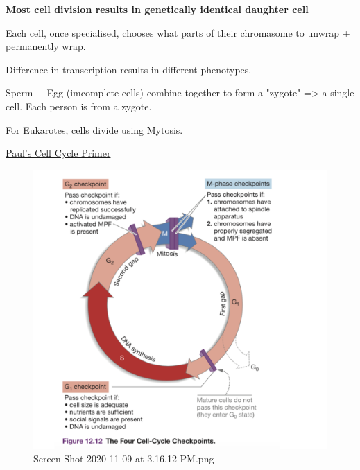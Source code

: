 \documentclass[letterpaper]{article}
\begin{document}
\textbf{Most cell division results in genetically identical daughter cell}

Each cell, once specialised, chooses what parts of their chromasome to
unwrap + permanently wrap.

Difference in transcription results in different phenotypes.

Sperm + Egg (imcomplete cells) combine together to form a "zygote" => a
single cell. Each person is from a zygote.

For Eukarotes, cells divide using Mytosis.

\href{https://docs.google.com/document/d/1TIrgR9VSV3attTK\_QP-AOCs33mMoBP0Cz7DQXysKoD0/edit}{Paul's
Cell Cycle Primer}

\begin{figure}[htbp]
\centering
\includegraphics[width=.9\linewidth]{Screen Shot 2020-11-09 at 3.16.12 PM.png}
\caption{Screen Shot 2020-11-09 at 3.16.12 PM.png}
\end{figure}
\end{document}
